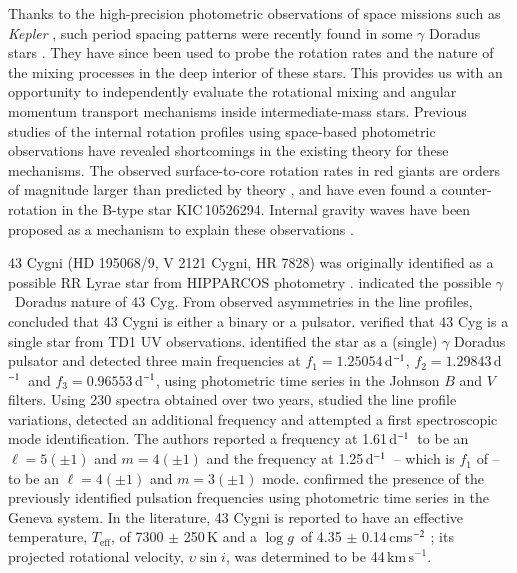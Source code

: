 \documentclass{aa}
\def\gdor{$\gamma$~Doradus }
\def\Teff{\ensuremath{T_{\mathrm{eff}}}}
\def\cd{d$^{\rm -1}$}
\def\logg{\ensuremath{\log g}}
\def\vsini{\ensuremath{{\upsilon}\sin i}}
\def\kms{$\mathrm{km\,s}^{-1}$}
\begin{document}
Thanks to the high-precision photometric observations of space missions such as {\em Kepler} \citep{koch2010}, such period spacing patterns were recently found in some $\gamma$ Doradus stars \citep[e.g.,][]{chapellier2012,kurtz2014,bedding2015,vanreeth2015apjs,keen2015,saio2015}. They have since been used to probe the rotation rates \citep[e.g,][]{murphy2016,vanreeth2016,ouazzani2017,sowicka2017,guo2017} and the nature of the mixing processes \citep[e.g.,][]{schmidaerts2016} in the deep interior of these stars. This provides us with an opportunity to independently evaluate the rotational mixing and angular momentum transport mechanisms inside intermediate-mass stars. Previous studies of the internal rotation profiles using space-based photometric observations have revealed shortcomings in the existing theory for these mechanisms. The observed surface-to-core rotation rates in red giants are orders of magnitude larger than predicted by theory \citep[e.g.,][]{marques2013,cantiello2014}, and \citet{Triana2015} have even found a counter-rotation in the B-type star KIC\,10526294. Internal gravity waves have been proposed as a mechanism to explain these observations \citep{rogers2013,rogers2015}.

43 Cygni (HD 195068/9, V 2121 Cygni, HR 7828) was originally identified as a possible RR Lyrae star from HIPPARCOS photometry \citep{perryman1997}.  \citet{handler1999} indicated the possible \gdor nature of 43 Cyg.
From observed asymmetries in the line profiles, \citet{fekel2003} concluded that 43 Cygni is either a binary or a pulsator. \citet{gerbaldi2007} verified that 43 Cyg is a single star from TD1 UV observations.
\citet{henry2005} identified the star as a (single) $\gamma$ Doradus pulsator and detected three main frequencies at $f_1 = 1.25054$\,\cd, $f_2 = 1.29843$\,\cd\ and $f_3 = 0.96553$\,\cd, using photometric time series in the Johnson $B$ and $V$ filters.
Using 230 spectra obtained over two years, \citet{jankov2006} studied the line profile variations, detected an additional frequency and attempted a first spectroscopic mode identification. The authors reported a frequency at 1.61\,\cd\ to be an $\ell = 5 (\pm 1)$ and $m = 4 (\pm 1)$ and the frequency at 1.25\,\cd\ -- which is $f_1$ of \citet{henry2005} -- to be an $\ell = 4 (\pm 1)$ and $m = 3 (\pm 1)$ mode.
 \citet{cuypers2009} confirmed the presence of the previously identified pulsation frequencies using photometric time series in the Geneva system.
In the literature, 43 Cygni is reported to have an effective temperature, \Teff, of 7300 $\pm$ 250\,K and a \logg\ of 4.35 $\pm$ 0.14\,cms$^{\rm -2}$ \citep{david2015}; its projected rotational velocity, \vsini, was determined to be 44\,\kms \citep[e.g.,][]{fekel2003}. 
\end{document}
